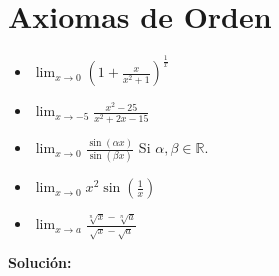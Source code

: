 \documentclass[12pt]{book}
\begin{document}
\chapter{Axiomas de Orden}

\begin{prob}{}{}
    \begin{itemize}
        \item[\textbf{a)}] $\displaystyle \lim_{x\to 0} \left(1 + \frac{x}{x^2+1}\right)^{\frac{1}{x}}$ 
        \item[\textbf{b)}] $\displaystyle \lim_{x \to -5} \frac{x^2-25}{x^2+2x-15}$ 
        \item[\textbf{c)}] $\displaystyle \lim_{x \to 0} \frac{\sin(\alpha x )}{\sin(\beta x)}$ \quad Si $\alpha,\beta \in \mathbb{R}$.
        \item[\textbf{d)}] $\displaystyle \lim_{x \to 0} x^2 \sin\left(\frac{1}{x}\right)$

        \item[\textbf{f)}] $\displaystyle \lim_{x \to a } \frac{\sqrt[n]{x}-\sqrt[n]{a}}{\sqrt{x}-\sqrt{a}}$
    \end{itemize}
\end{prob}
\textbf{Solución:}
\end{document}

